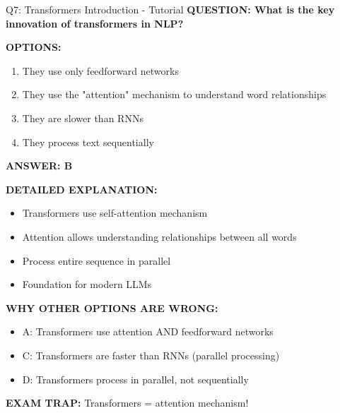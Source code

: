 \documentclass[8pt]{beamer}
\begin{document}
	\begin{frame}{Q7: Transformers Introduction - Tutorial}
		\fontsize{6.5}{7.5}\selectfont
		\textbf{QUESTION: What is the key innovation of transformers in NLP?}
		
		\vspace{0.1cm}
		\textbf{OPTIONS:}
		\begin{enumerate}
			\item They use only feedforward networks
			\item They use the "attention" mechanism to understand word relationships
			\item They are slower than RNNs
			\item They process text sequentially
		\end{enumerate}
		
		\vspace{0.1cm}
		\textcolor{myblue}{\textbf{ANSWER: B}}
		
		\vspace{0.1cm}
		\textbf{DETAILED EXPLANATION:}
		\begin{itemize}
			\item Transformers use self-attention mechanism
			\item Attention allows understanding relationships between all words
			\item Process entire sequence in parallel
			\item Foundation for modern LLMs
		\end{itemize}
		
		\vspace{0.1cm}
		\textcolor{myred}{\textbf{WHY OTHER OPTIONS ARE WRONG:}}
		\begin{itemize}
			\item \textcolor{myred}{A:} Transformers use attention AND feedforward networks
			\item \textcolor{myred}{C:} Transformers are faster than RNNs (parallel processing)
			\item \textcolor{myred}{D:} Transformers process in parallel, not sequentially
		\end{itemize}
		
		\textcolor{myred}{\textbf{EXAM TRAP:}} Transformers = \textcolor{myblue}{attention mechanism}!
	\end{frame}
	
\end{document}
